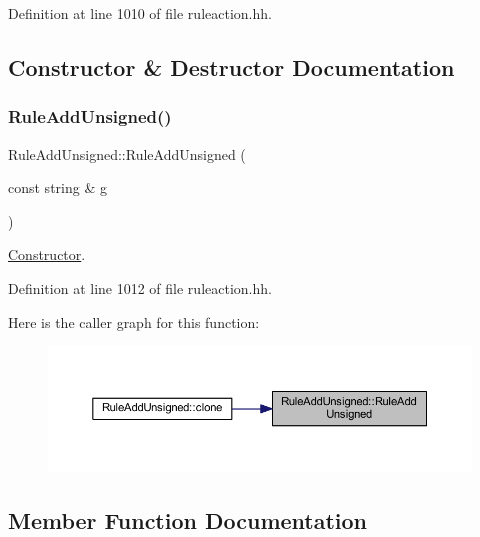 Definition at line 1010 of file ruleaction.\+hh.



\subsection{Constructor \& Destructor Documentation}
\mbox{\label{class_rule_add_unsigned_af3ef72b4f5726b2d0f8b3bf76eaedb65}} 
\subsubsection{\texorpdfstring{RuleAddUnsigned()}{RuleAddUnsigned()}}
{\footnotesize\ttfamily Rule\+Add\+Unsigned\+::\+Rule\+Add\+Unsigned (\begin{DoxyParamCaption}\item[{const string \&}]{g }\end{DoxyParamCaption})\hspace{0.3cm}{\ttfamily [inline]}}



\mbox{\hyperlink{class_constructor}{Constructor}}. 



Definition at line 1012 of file ruleaction.\+hh.

Here is the caller graph for this function\+:
\nopagebreak
\begin{figure}[H]
\begin{center}
\leavevmode
\includegraphics[width=350pt]{class_rule_add_unsigned_af3ef72b4f5726b2d0f8b3bf76eaedb65_icgraph}
\end{center}
\end{figure}


\subsection{Member Function Documentation}
\mbox{\label{class_rule_add_unsigned_a07c326702413b71711277439c247b932}} 
